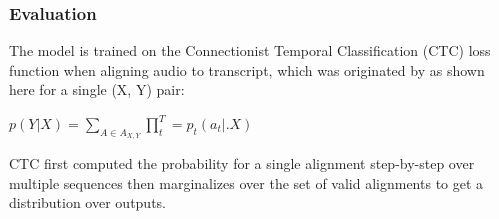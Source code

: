 \subsubsection{Evaluation}

The model is trained on the Connectionist Temporal Classification (CTC) loss function when aligning audio to transcript, which was originated by \cite{} as shown here for a single (X, Y) pair: 
\begin{center}
$p(Y | X) = \sum_{A\in A_{X, Y}} \prod_t^T = p_t(a_t |. X)$    
\end{center}

CTC first computed the probability for a single alignment step-by-step over multiple sequences then marginalizes over the set of valid alignments to get a distribution over outputs.  